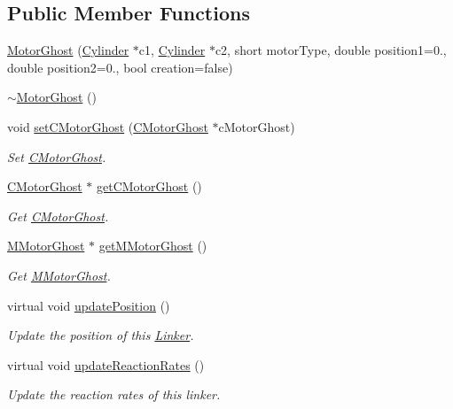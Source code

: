 \subsection*{Public Member Functions}
\begin{DoxyCompactItemize}
\item 
\hyperlink{classMotorGhost_a9ba4c13536cdb7b2e4a12bc9d55c5835}{Motor\+Ghost} (\hyperlink{classCylinder}{Cylinder} $\ast$c1, \hyperlink{classCylinder}{Cylinder} $\ast$c2, short motor\+Type, double position1=0., double position2=0., bool creation=false)
\item 
\hyperlink{classMotorGhost_a6b8892fc4742a822f51585d533aeb0e9}{$\sim$\+Motor\+Ghost} ()
\item 
void \hyperlink{classMotorGhost_a3bef182cfc2047f69a82b3a583aa9444}{set\+C\+Motor\+Ghost} (\hyperlink{classCMotorGhost}{C\+Motor\+Ghost} $\ast$c\+Motor\+Ghost)
\begin{DoxyCompactList}\small\item\em Set \hyperlink{classCMotorGhost}{C\+Motor\+Ghost}. \end{DoxyCompactList}\item 
\hyperlink{classCMotorGhost}{C\+Motor\+Ghost} $\ast$ \hyperlink{classMotorGhost_adb0f3b2729f8f28534993ceef444299a}{get\+C\+Motor\+Ghost} ()
\begin{DoxyCompactList}\small\item\em Get \hyperlink{classCMotorGhost}{C\+Motor\+Ghost}. \end{DoxyCompactList}\item 
\hyperlink{classMMotorGhost}{M\+Motor\+Ghost} $\ast$ \hyperlink{classMotorGhost_afd679c4de83f5cd0dfd870f7db069f32}{get\+M\+Motor\+Ghost} ()
\begin{DoxyCompactList}\small\item\em Get \hyperlink{classMMotorGhost}{M\+Motor\+Ghost}. \end{DoxyCompactList}\item 
virtual void \hyperlink{classMotorGhost_af5160d203173a203b91bfe2e1461acf8}{update\+Position} ()
\begin{DoxyCompactList}\small\item\em Update the position of this \hyperlink{classLinker}{Linker}. \end{DoxyCompactList}\item 
virtual void \hyperlink{classMotorGhost_af04a329034d73a637f72afd14ec0709f}{update\+Reaction\+Rates} ()
\begin{DoxyCompactList}\small\item\em Update the reaction rates of this linker. \end{DoxyCompactList}\item 

\end{DoxyCompactItemize}
